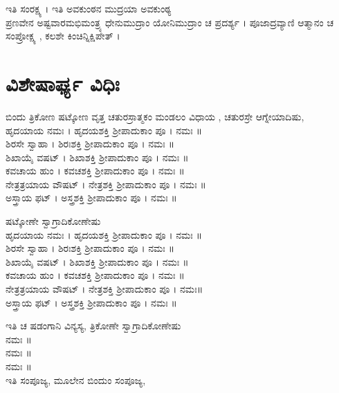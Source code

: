  ಇತಿ ಸಂರಕ್ಷ್ಯ ।  ಇತಿ ಅವಕುಂಠನ ಮುದ್ರಯಾ ಅವಕುಂಠ್ಯ\\
ಪ್ರಣವೇನ ಅಷ್ಟವಾರಮಭಿಮಂತ್ರ್ಯ ಧೇನುಮುದ್ರಾಂ ಯೋನಿಮುದ್ರಾಂ ಚ ಪ್ರದರ್ಶ್ಯ ।  ಪೂಜಾದ್ರವ್ಯಾಣಿ ಆತ್ಮಾನಂ ಚ ಸಂಪ್ರೋಕ್ಷ್ಯ , ಕಲಶೇ ಕಿಂಚಿನ್ನಿಕ್ಷಿಪೇತ್ ।

\section{ವಿಶೇಷಾರ್ಘ್ಯ ವಿಧಿಃ}
ಬಿಂದು ತ್ರಿಕೋಣ ಷಟ್ಕೋಣ ವೃತ್ತ ಚತುರಸ್ರಾತ್ಮಕಂ ಮಂಡಲಂ ವಿಧಾಯ , ಚತುರಸ್ರೇ ಆಗ್ನೇಯಾದಿಷು,\\
 ಹೃದಯಾಯ ನಮಃ । ಹೃದಯಶಕ್ತಿ ಶ್ರೀಪಾದುಕಾಂ ಪೂ । ನಮಃ ॥\\
 ಶಿರಸೇ ಸ್ವಾಹಾ । ಶಿರಃಶಕ್ತಿ ಶ್ರೀಪಾದುಕಾಂ ಪೂ । ನಮಃ ॥\\
 ಶಿಖಾಯೈ ವಷಟ್ । ಶಿಖಾಶಕ್ತಿ ಶ್ರೀಪಾದುಕಾಂ ಪೂ । ನಮಃ ॥\\
 ಕವಚಾಯ ಹುಂ । ಕವಚಶಕ್ತಿ ಶ್ರೀಪಾದುಕಾಂ ಪೂ । ನಮಃ ॥\\
 ನೇತ್ರತ್ರಯಾಯ ವೌಷಟ್ । ನೇತ್ರಶಕ್ತಿ ಶ್ರೀಪಾದುಕಾಂ ಪೂ । ನಮಃ ॥\\
 ಅಸ್ತ್ರಾಯ ಫಟ್ । ಅಸ್ತ್ರಶಕ್ತಿ ಶ್ರೀಪಾದುಕಾಂ ಪೂ । ನಮಃ ॥

ಷಟ್ಕೋಣೇ ಸ್ವಾಗ್ರಾದಿಕೋಣೇಷು\\
 ಹೃದಯಾಯ ನಮಃ । ಹೃದಯಶಕ್ತಿ ಶ್ರೀಪಾದುಕಾಂ ಪೂ । ನಮಃ ॥\\
 ಶಿರಸೇ ಸ್ವಾಹಾ । ಶಿರಃಶಕ್ತಿ ಶ್ರೀಪಾದುಕಾಂ ಪೂ । ನಮಃ ॥\\
 ಶಿಖಾಯೈ ವಷಟ್ । ಶಿಖಾಶಕ್ತಿ ಶ್ರೀಪಾದುಕಾಂ ಪೂ । ನಮಃ ॥\\
 ಕವಚಾಯ ಹುಂ । ಕವಚಶಕ್ತಿ ಶ್ರೀಪಾದುಕಾಂ ಪೂ । ನಮಃ ॥\\
 ನೇತ್ರತ್ರಯಾಯ ವೌಷಟ್ । ನೇತ್ರಶಕ್ತಿ ಶ್ರೀಪಾದುಕಾಂ ಪೂ । ನಮಃ॥\\
 ಅಸ್ತ್ರಾಯ ಫಟ್ । ಅಸ್ತ್ರಶಕ್ತಿ ಶ್ರೀಪಾದುಕಾಂ ಪೂ । ನಮಃ ॥

ಇತಿ ಚ ಷಡಂಗಾನಿ ವಿನ್ಯಸ್ಯ, ತ್ರಿಕೋಣೇ ಸ್ವಾಗ್ರಾದಿಕೋಣೇಷು\\
 ನಮಃ ॥\\
 ನಮಃ ॥\\
 ನಮಃ ॥\\

ಇತಿ ಸಂಪೂಜ್ಯ, ಮೂಲೇನ ಬಿಂದುಂ ಸಂಪೂಜ್ಯ, 

